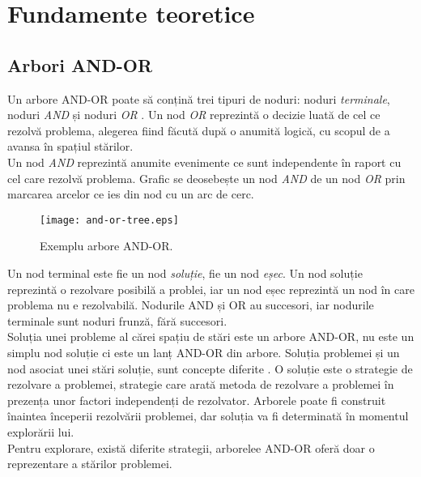 \documentclass[12pt,twoside,a4paper,fleqn]{book}
\theoremstyle{definition}
\begin{document}
\chapter{Fundamente teoretice}

\section{Arbori AND-OR}
Un arbore AND-OR poate să conțină trei tipuri de noduri: noduri \emph{terminale}, noduri \emph{AND} și noduri \emph{OR} \cite{Giumale}. Un nod \emph{OR} reprezintă o decizie luată de cel ce rezolvă problema, alegerea fiind făcută după o anumită logică, cu scopul de a avansa în spațiul stărilor.\\
Un nod \emph{AND} reprezintă anumite evenimente ce sunt independente în raport cu cel care rezolvă problema. Grafic se deosebește un nod \emph{AND} de un nod \emph{OR} prin marcarea arcelor ce ies din nod cu un arc de cerc.

\begin{figure}[h]
\begin{center}
\texttt{[image: and-or-tree.eps]}
\caption{\small{Exemplu arbore AND-OR.}}
\label{fig:and_or_tree}
\end{center}
\end{figure}

Un nod terminal este fie un nod \emph{soluție}, fie un nod \emph{eșec}. Un nod soluție reprezintă o rezolvare posibilă a problei, iar un nod eșec reprezintă un nod în care problema nu e rezolvabilă. Nodurile AND și OR au succesori, iar nodurile terminale sunt noduri frunză, fără succesori.\\
Soluția unei probleme al cărei spațiu de stări este un arbore AND-OR, nu este un simplu nod soluție ci este un lanț AND-OR din arbore. Soluția problemei și un nod asociat unei stări soluție, sunt concepte diferite \cite{Giumale}. O soluție este o strategie de rezolvare a problemei, strategie care arată metoda de rezolvare a problemei în prezența unor factori independenți de rezolvator. Arborele poate fi construit înaintea începerii rezolvării problemei, dar soluția va fi determinată în momentul explorării lui.\\
Pentru explorare, există diferite strategii, arborelee AND-OR oferă doar o reprezentare a stărilor problemei.
\end{document}
